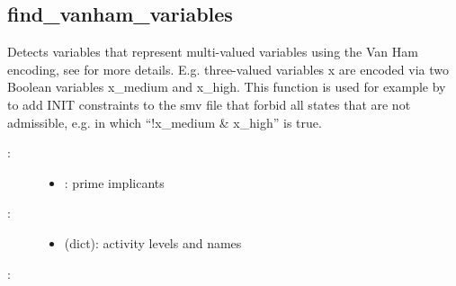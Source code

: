\documentclass[letterpaper,10pt,english]{sphinxmanual}
\begin{document}
\subsection{find\_vanham\_variables}
\label{\detokenize{StateTransitionGraphs:id18}}\label{\detokenize{StateTransitionGraphs:find-vanham-variables}}

\begin{fulllineitems}
\label{\detokenize{StateTransitionGraphs:PyBoolNet.StateTransitionGraphs.find_vanham_variables}}
Detects variables that represent multi-valued variables using the Van Ham encoding, see  for more details.
E.g. three-valued variables x are encoded via two Boolean variables x\_medium and x\_high.
This function is used for example by {\hyperref[\detokenize{ModelChecking:primes2smv}]{}} to add
INIT constraints to the smv file that forbid all states that are not admissible, e.g. in which “!x\_medium \& x\_high” is true.
\begin{description}
\item[{:}] \leavevmode\begin{itemize}
\item {} 
: prime implicants

\end{itemize}

\item[{:}] \leavevmode\begin{itemize}
\item {} 
 (dict): activity levels and names

\end{itemize}

\end{description}

:

\begin{sphinxVerbatim}[commandchars=\\\{\}]
\end{sphinxVerbatim}

\end{fulllineitems}
\end{document}
